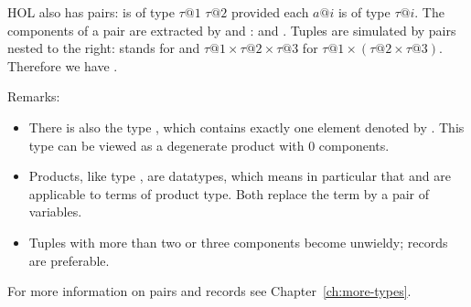 %
\begin{isabellebody}%
\def\isabellecontext{pairs}%
%
\begin{isamarkuptext}%
\label{sec:pairs}
HOL also has pairs:  is of type $\tau@1$
 $\tau@2$ provided each $a@i$ is of type
$\tau@i$. The components of a pair are extracted by  and
:
  and . Tuples
are simulated by pairs nested to the right:  stands
for  and $\tau@1 \times \tau@2 \times \tau@3$ for
$\tau@1 \times (\tau@2 \times \tau@3)$. Therefore we have
.

Remarks:
\begin{itemize}
\item
There is also the type , which contains exactly one
element denoted by . This type can be viewed
as a degenerate product with 0 components.
\item
Products, like type , are datatypes, which means
in particular that  and  are applicable to
terms of product type.
Both replace the term by a pair of variables.
\item
Tuples with more than two or three components become unwieldy;
records are preferable.
\end{itemize}
For more information on pairs and records see Chapter~\ref{ch:more-types}.%
\end{isamarkuptext}%
\end{isabellebody}%
